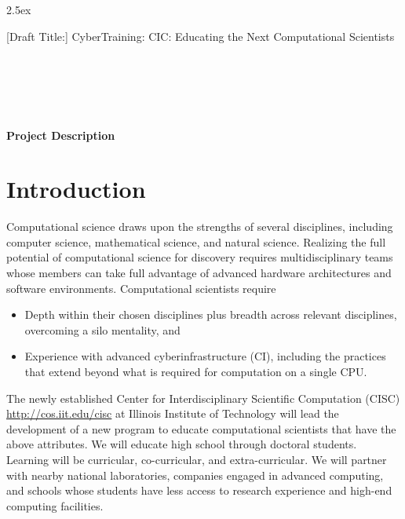 \documentclass[11pt]{NSFamsart}
\begin{document}
\leftmargini2.5ex %

[Draft Title:]  	CyberTraining: CIC:  Educating the Next Computational Scientists

\noindent
{}\\
 \\
 \\
 \\

\bigskip


\bigskip

\centerline{\Large \textbf{Project Description}}
\vspace{-2ex}

\setcounter{tocdepth}{1}
\tableofcontents %

\vspace{-6ex}

\section{Introduction}
Computational science draws upon the strengths of several disciplines, including computer science, mathematical science, and natural science.  Realizing the full potential of computational science for discovery requires multidisciplinary teams whose members can take full advantage of advanced hardware architectures and software environments.  Computational scientists require

\begin{itemize}
\item Depth within their chosen disciplines plus breadth across relevant disciplines, overcoming a silo mentality, and
\item Experience with advanced cyberinfrastructure (CI), including the practices that extend beyond what is required for computation on a single CPU.
\end{itemize}

The newly established Center for Interdisciplinary Scientific Computation (CISC) \url{http://cos.iit.edu/cisc} at Illinois Institute of Technology will lead the development of a new program to educate computational scientists that have the above attributes.  We will educate high school through doctoral students.  Learning will be curricular, co-curricular, and extra-curricular.  We will partner with nearby national laboratories, companies engaged in advanced computing, and schools whose students have less access to research experience and high-end computing facilities.
\end{document}
